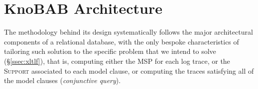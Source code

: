 \section{KnoBAB Architecture}\label{sec:karch}
The methodology behind its design systematically follows the major architectural components of a relational database, with the only bespoke characteristics of tailoring such solution to the specific problem that we intend to solve (\S\ref{ssec:xltlf}), that is, computing either the MSP for each log trace,  or the \textsc{Support} associated to each model clause, or computing the traces satisfying all of the model clauses (\textit{conjunctive query}).

